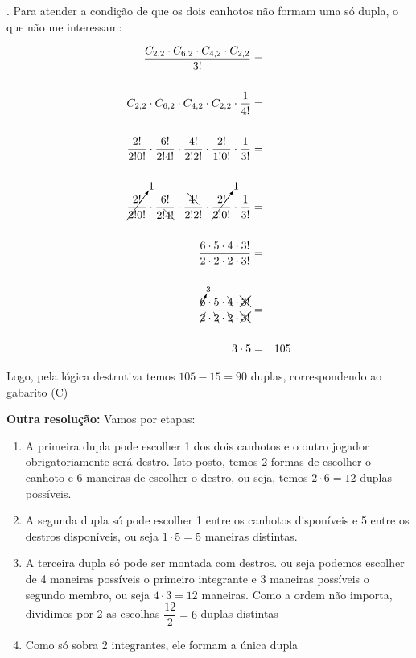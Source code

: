 . Para atender a condição de que os dois canhotos não formam uma só dupla, o que não me interessam:

\begin{eqnarray*}
\dfrac{C_{2, 2} \cdot C_{6, 2} \cdot C_{4, 2} \cdot C_{2, 2}  }{3!} &=& \\
\\
C_{2, 2} \cdot C_{6, 2} \cdot C_{4, 2} \cdot C_{2, 2}  \cdot \dfrac{1}{4!} &=& \\
\\
\dfrac{2!}{2! 0!} \cdot \dfrac{6!}{2! 4!} \cdot \dfrac{4!}{2! 2!} \cdot \dfrac{2!}{1! 0!} \cdot
\dfrac{1}{3!}  &=& \\
\\
\cancelto{1}{\dfrac{2!}{2! 0!}} \cdot \dfrac{6!}{2! \bcancel{4!}} \cdot \dfrac{\bcancel{4!}}{2! 2!} \cdot \cancelto{1}{\dfrac{2!}{2! 0!}}  \cdot
\dfrac{1}{3!}  &=& \\
\\
\dfrac{6 \cdot 5 \cdot 4 \cdot 3!}{ 2 \cdot 2 \cdot 2 \cdot 3!}  &=& \\
\\
\dfrac{\cancelto{3}{6} \cdot 5 \cdot \bcancel{4} \cdot \xcancel{3!}}{ \cancel{2} \cdot \bcancel{2} \cdot \bcancel{2} \cdot \xcancel{3!}}  &=& \\
\\
3 \cdot 5  &=& 105
\end{eqnarray*}
 
Logo, pela lógica destrutiva temos $ 105 - 15 = 90 $ duplas, correspondendo ao gabarito (C)

\textbf{Outra resolução:}
Vamos por etapas:

\begin{enumerate}
    \item A primeira dupla pode escolher 1 dos dois canhotos e o outro jogador obrigatoriamente será destro. Isto posto, temos 2 formas de escolher o canhoto e 6 maneiras de escolher o destro, ou seja, temos $ 2 \cdot 6 = 12 $ duplas possíveis. 
    \item A segunda dupla só pode escolher 1 entre os canhotos disponíveis e 5 entre os destros disponíveis, ou seja $ 1 \cdot 5  = 5 $ maneiras distintas.
    \item A terceira dupla só pode ser montada com destros. ou seja podemos escolher de 4 maneiras possíveis o primeiro integrante e 3 maneiras possíveis o segundo membro, ou seja $ 4 \cdot 3  = 12 $ maneiras. Como a ordem não importa, dividimos por 2 as escolhas $ \dfrac{12}{2} = 6$ duplas distintas
    \item Como só sobra 2 integrantes, ele formam a única dupla
\end{enumerate}

